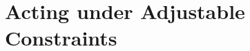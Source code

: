 
\graphicspath{{2-Chapters/5-Chapter/}}

\chapter{Acting under Adjustable Constraints}
\label{chapter:5}
